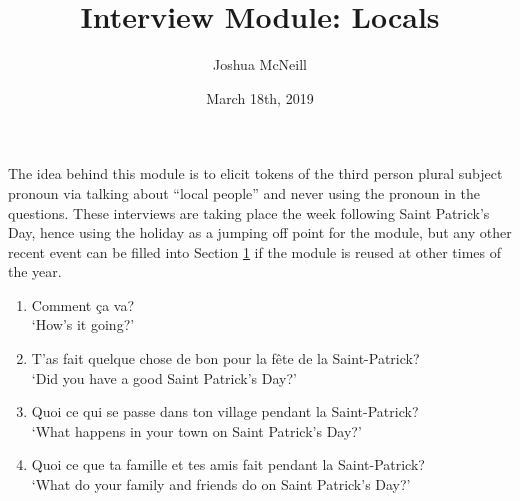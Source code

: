 \documentclass{article}
\title{Interview Module: Locals}
\author{Joshua McNeill}
\date{March 18th, 2019}
\begin{document}
    \maketitle
    The idea behind this module is to elicit tokens of the third person plural subject pronoun via talking about ``local people'' and never using the pronoun in the questions. These interviews are taking place the week following Saint Patrick's Day, hence using the holiday as a jumping off point for the module, but any other recent event can be filled into Section \ref{sec:warmup} if the module is reused at other times of the year.
    
    \begin{enumerate}
        \section{Warmup Questions}
            \label{sec:warmup}
            \item Comment ça va?\\
                  `How's it going?'
            \item T'as fait quelque chose de bon pour la fête de la Saint-Patrick?\\
                  `Did you have a good Saint Patrick's Day?'
            \item Quoi ce qui se passe dans ton village pendant la Saint-Patrick?\\
                  `What happens in your town on Saint Patrick's Day?'
            \item Quoi ce que ta famille et tes amis fait pendant la Saint-Patrick?\\
                  `What do your family and friends do on Saint Patrick's Day?'

\end{enumerate}
\end{document}

